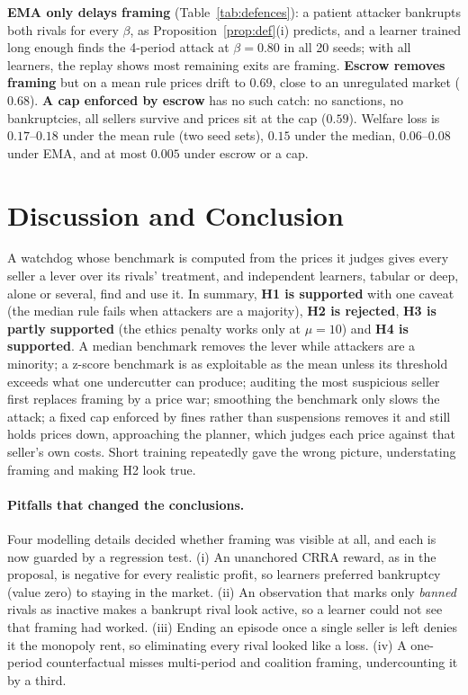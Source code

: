 \documentclass{article}
\begin{document}
\textbf{EMA only delays framing} (Table~\ref{tab:defences}): a patient attacker bankrupts both rivals for every $\beta$, as Proposition~\ref{prop:def}(i) predicts, and a learner trained long enough finds the 4-period attack at $\beta=0.80$ in all 20 seeds; with all learners, the replay shows most remaining exits are framing. \textbf{Escrow removes framing} but on a mean rule prices drift to $0.69$, close to an unregulated market ($0.68$). \textbf{A cap enforced by escrow} has no such catch: no sanctions, no bankruptcies, all sellers survive and prices sit at the cap ($0.59$). Welfare loss is $0.17$--$0.18$ under the mean rule (two seed sets), $0.15$ under the median, $0.06$--$0.08$ under EMA, and at most $0.005$ under escrow or a cap.

\section{Discussion and Conclusion}\label{sec:disc}


A watchdog whose benchmark is computed from the prices it judges gives every seller a lever over its rivals' treatment, and independent learners, tabular or deep, alone or several, find and use it. In summary, \textbf{H1 is supported} with one caveat (the median rule fails when attackers are a majority), \textbf{H2 is rejected}, \textbf{H3 is partly supported} (the ethics penalty works only at $\mu=10$) and \textbf{H4 is supported}. A median benchmark removes the lever while attackers are a minority; a z-score benchmark is as exploitable as the mean unless its threshold exceeds what one undercutter can produce; auditing the most suspicious seller first replaces framing by a price war; smoothing the benchmark only slows the attack; a fixed cap enforced by fines rather than suspensions removes it and still holds prices down, approaching the planner, which judges each price against that seller's own costs. Short training repeatedly gave the wrong picture, understating framing and making H2 look true.

\paragraph{Pitfalls that changed the conclusions.} Four modelling details decided whether framing was visible at all, and each is now guarded by a regression test. (i) An unanchored CRRA reward, as in the proposal, is negative for every realistic profit, so learners preferred bankruptcy (value zero) to staying in the market. (ii) An observation that marks only \emph{banned} rivals as inactive makes a bankrupt rival look active, so a learner could not see that framing had worked. (iii) Ending an episode once a single seller is left denies it the monopoly rent, so eliminating every rival looked like a loss. (iv) A one-period counterfactual misses multi-period and coalition framing, undercounting it by a third.
\end{document}

